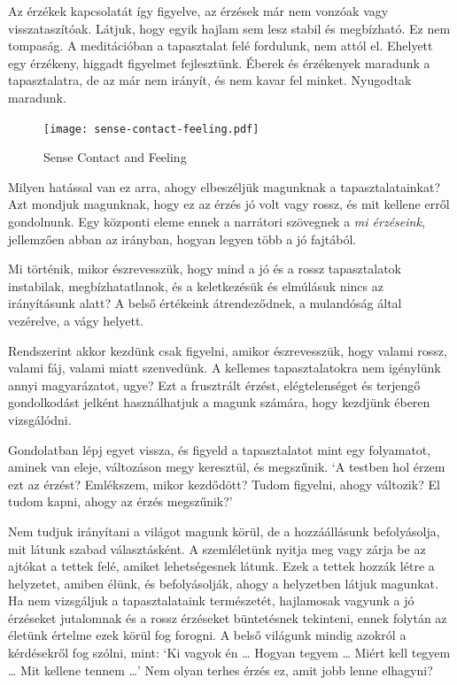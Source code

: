 Az érzékek kapcsolatát így figyelve, az érzések már nem vonzóak vagy
visszataszítóak. Látjuk, hogy egyik hajlam sem lesz stabil és
megbízható. Ez nem tompaság. A meditációban a tapasztalat felé
fordulunk, nem attól el. Ehelyett egy érzékeny, higgadt figyelmet
fejlesztünk. Éberek és érzékenyek maradunk a tapasztalatra, de az már
nem irányít, és nem kavar fel minket. Nyugodtak maradunk.

\clearpage

\begin{figure}[h]
\caption{Sense Contact and Feeling}\label{fig-sense-contact-feeling}
\bigskip\centering
\texttt{[image: sense-contact-feeling.pdf]}
\end{figure}

\clearpage


Milyen hatással van ez arra, ahogy elbeszéljük magunknak a
tapasztalatainkat? Azt mondjuk magunknak, hogy ez az érzés jó volt vagy
rossz, és mit kellene erről gondolnunk. Egy központi eleme ennek a
narrátori szövegnek a \emph{mi érzéseink}, jellemzően abban az irányban,
hogyan legyen több a jó fajtából.

Mi történik, mikor észrevesszük, hogy mind a jó és a rossz tapasztalatok
instabilak, megbízhatatlanok, és a keletkezésük és elmúlásuk nincs az
irányításunk alatt? A belső értékeink átrendeződnek, a mulandóság által
vezérelve, a vágy helyett.


Rendszerint akkor kezdünk csak figyelni, amikor észrevesszük, hogy
valami rossz, valami fáj, valami miatt szenvedünk. A kellemes
tapasztalatokra nem igénylünk annyi magyarázatot, ugye? Ezt a frusztrált
érzést, elégtelenséget és terjengő gondolkodást jelként használhatjuk a
magunk számára, hogy kezdjünk éberen vizsgálódni.

Gondolatban lépj egyet vissza, és figyeld a tapasztalatot mint egy
folyamatot, aminek van eleje, változáson megy keresztül, és megszűnik.
`A testben hol érzem ezt az érzést? Emlékszem, mikor kezdődött? Tudom
figyelni, ahogy változik? El tudom kapni, ahogy az érzés megszűnik?'

Nem tudjuk irányítani a világot magunk körül, de a hozzáállásunk
befolyásolja, mit látunk szabad választásként. A szemléletünk nyitja meg
vagy zárja be az ajtókat a tettek felé, amiket lehetségesnek látunk.
Ezek a tettek hozzák létre a helyzetet, amiben élünk, és befolyásolják,
ahogy a helyzetben látjuk magunkat. Ha nem vizsgáljuk a tapasztalataink
természetét, hajlamosak vagyunk a jó érzéseket jutalomnak és a rossz
érzéseket büntetésnek tekinteni, ennek folytán az életünk értelme ezek
körül fog forogni. A belső világunk mindig azokról a kérdésekről fog
szólni, mint: `Ki vagyok én \ldots{} Hogyan tegyem \ldots{} Miért kell
tegyem \ldots{} Mit kellene tennem \ldots{}' Nem olyan terhes érzés ez,
amit jobb lenne elhagyni?

